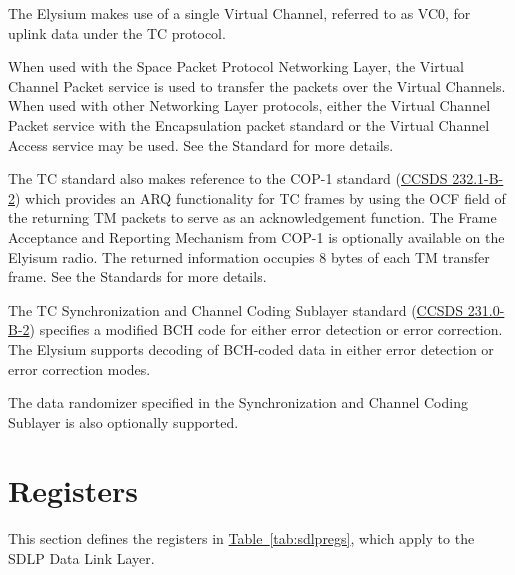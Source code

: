 \documentclass{hitec}
\newcommand{\tabref}[1]{\hyperref[tab:#1]{Table~\ref{tab:#1}}}
\begin{document}
The Elysium makes use of a single Virtual Channel, referred to as VC0, for
uplink data under the TC protocol. 

When used with the Space Packet Protocol Networking Layer, the Virtual Channel
Packet service is used to transfer the packets over the Virtual Channels. When
used with other Networking Layer protocols, either the Virtual Channel Packet
service with the Encapsulation packet standard or the Virtual Channel Access
service may be used. See the Standard for more details.

The TC standard also makes reference to the COP-1 standard
(\href{https://public.ccsds.org/Pubs/232x1b2.pdf}{CCSDS 232.1-B-2}) which
provides an ARQ functionality for TC frames by using the OCF field of the
returning TM packets to serve as an acknowledgement function. The Frame
Acceptance and Reporting Mechanism from COP-1 is optionally available on the
Elyisum radio. The returned information occupies 8 bytes of each TM transfer
frame. See the Standards for more details.

The TC Synchronization and Channel Coding Sublayer standard
(\href{https://public.ccsds.org/Pubs/231x0b2c1.pdf}{CCSDS 231.0-B-2}) specifies
a modified BCH code for either error detection or error correction. The Elysium
supports decoding of BCH-coded data in either error detection or error
correction modes.

The data randomizer specified in the Synchronization and Channel Coding
Sublayer is also optionally supported.

\section{Registers}
\label{sec:sdlpregs}

This section defines the registers in \tabref{sdlpregs}, which apply to the
SDLP Data Link Layer.
\end{document}
